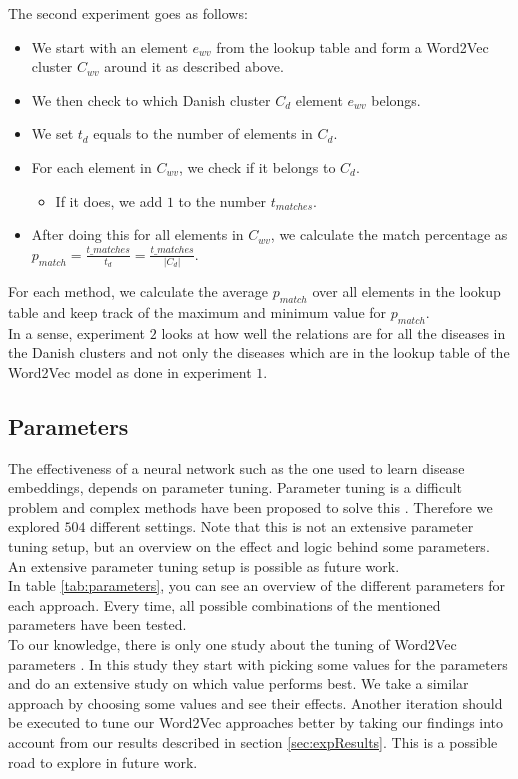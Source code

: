 \noindent The second experiment goes as follows:

\begin{itemize}

\item We start with an element $e_{wv}$ from the lookup table and form a Word2Vec cluster $C_{wv}$ around it as described above.
\item We then check to which Danish cluster $C_d$ element $e_{wv}$ belongs.
\item We set $t_{d}$ equals to the number of elements in $C_d$.
\item For each element in $C_{wv}$, we check if it belongs to $C_d$.
\begin{itemize}
\item If it does, we add $1$ to the number $t_{matches}$.
\end{itemize}
\item After doing this for all elements in $C_{wv}$, we calculate the match percentage as $p_{match} = \frac{t\_{matches}}{t_{d}} = \frac{t\_{matches}}{\left| C_{d} \right|}$.

\end{itemize}

For each method, we calculate the average $p_{match}$ over all elements in the lookup table and keep track of the maximum and minimum value for $p_{match}$. \\

In a sense, experiment $2$ looks at how well the relations are for all the diseases in the Danish clusters and not only the diseases which are in the lookup table of the Word2Vec model as done in experiment $1$.


\subsection{Parameters}
\label{sec:parameters}

The effectiveness of a neural network such as the one used to learn disease embeddings, depends on parameter tuning. Parameter tuning is a difficult problem and complex methods have been proposed to solve this \cite{tuning:article}. Therefore we explored $504$ different settings. Note that this is not an extensive parameter tuning setup, but an overview on the effect and logic behind some parameters. An extensive parameter tuning setup is possible as future work. \\

In table \ref{tab:parameters}, you can see an overview of the different parameters for each approach. Every time, all possible combinations of the mentioned parameters have been tested. \\
To our knowledge, there is only one study about the tuning of Word2Vec parameters \cite{w2vTuning:article}. In this study they start with picking some values for the parameters and do an extensive study on which value performs best. We take a similar approach by choosing some values and see their effects. Another iteration should be executed to tune our Word2Vec approaches better by taking our findings into account from our results described in section \ref{sec:expResults}. This is a possible road to explore in future work. \\

